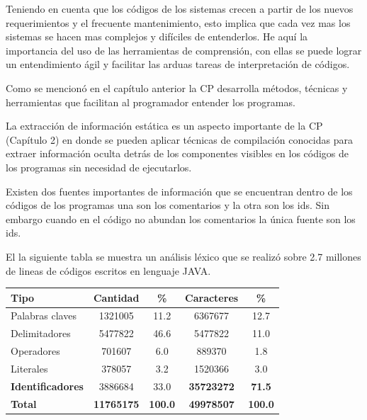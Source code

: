 \documentclass[a4paper,12pt]{report}
\begin{document}
Teniendo en cuenta que los códigos de los sistemas crecen a partir de los nuevos requerimientos y el frecuente mantenimiento, esto implica que cada vez mas los sistemas se hacen mas complejos y difíciles de entenderlos. He aquí la importancia del uso de las herramientas de comprensión, con ellas se puede lograr un entendimiento ágil y facilitar las arduas tareas de interpretación de códigos.

Como se mencionó en el capítulo anterior la CP desarrolla métodos, técnicas y herramientas que facilitan al programador entender los programas.

La extracción de información estática es un aspecto importante de la CP (Capítulo 2) en donde se pueden aplicar técnicas de compilación conocidas para extraer información oculta detrás de los componentes visibles en los códigos de los programas sin necesidad de ejecutarlos.

Existen dos fuentes importantes de información que se encuentran dentro de los códigos de los programas una son los comentarios y la otra son los ids. Sin embargo cuando en el código no abundan los comentarios la única fuente son los ids.


El la siguiente tabla se muestra un análisis léxico que se realizó sobre 2.7 millones de lineas de códigos escritos en lenguaje JAVA.\\

\begin{center}
   \begin{tabular}{| l | c | c | c | c | }
     \hline
     \textsf{Tipo} & \textsf{Cantidad} & \textsf{\%} & \textsf{Caracteres} & \textsf{\%} \\ \hline
     Palabras claves & 1321005 & 11.2 & 6367677 & 12.7 \\ \hline
     Delimitadores & 5477822 & 46.6 & 5477822 & 11.0 \\ \hline
     Operadores & 701607 & 6.0 & 889370 & 1.8 \\ \hline
     Literales & 378057 & 3.2 & 1520366 & 3.0 \\ \hline          
     \textbf{Identificadores} & 3886684 & 33.0 & \textbf{35723272} & \textbf{71.5} \\ \hline
     \textbf{Total} & \textbf{11765175} & \textbf{100.0} & \textbf{49978507} & \textbf{100.0} \\ \hline          
   \end{tabular}
\end{center}
\end{document}
